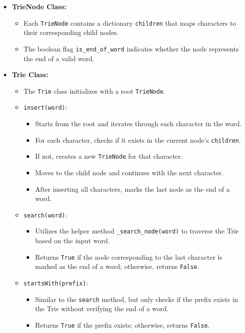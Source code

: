 \begin{itemize}
    \item \textbf{TrieNode Class:}
    \begin{itemize}
        \item Each \texttt{TrieNode} contains a dictionary \texttt{children} that maps characters to their corresponding child nodes.
        \item The boolean flag \texttt{is\_end\_of\_word} indicates whether the node represents the end of a valid word.
    \end{itemize}
    
    \item \textbf{Trie Class:}
    \begin{itemize}
        \item The \texttt{Trie} class initializes with a root \texttt{TrieNode}.
        
        \item \texttt{insert(word)}:
        \begin{itemize}
            \item Starts from the root and iterates through each character in the word.
            \item For each character, checks if it exists in the current node's \texttt{children}.
            \item If not, creates a new \texttt{TrieNode} for that character.
            \item Moves to the child node and continues with the next character.
            \item After inserting all characters, marks the last node as the end of a word.
        \end{itemize}
        
        \item \texttt{search(word)}:
        \begin{itemize}
            \item Utilizes the helper method \texttt{\_search\_node(word)} to traverse the Trie based on the input word.
            \item Returns \texttt{True} if the node corresponding to the last character is marked as the end of a word; otherwise, returns \texttt{False}.
        \end{itemize}
        
        \item \texttt{startsWith(prefix)}:
        \begin{itemize}
            \item Similar to the \texttt{search} method, but only checks if the prefix exists in the Trie without verifying the end of a word.
            \item Returns \texttt{True} if the prefix exists; otherwise, returns \texttt{False}.
        \end{itemize}
        

\end{itemize}
\end{itemize}
